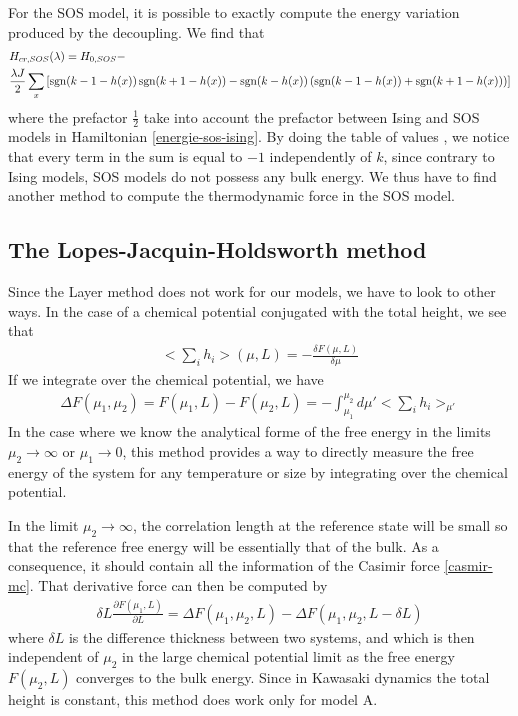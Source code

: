 For the SOS model, it is possible to exactly compute the energy variation produced by the decoupling. We find that
\begin{align}
&H_{cr,SOS}(\lambda) = H_{0,SOS} - \nonumber \\
&\frac{\lambda J}{2} \sum_x \left[ \operatorname{sgn}(k-1-h(x)) \operatorname{sgn}(k+1-h(x)) - \operatorname{sgn}(k-h(x)) \left( \operatorname{sgn}(k-1-h(x))+\operatorname{sgn}(k+1-h(x)) \right) \right]
\end{align}
where the prefactor $\frac{1}{2}$ take into account the prefactor between Ising and SOS models in Hamiltonian \eqref{energie-sos-ising}. By doing the table of values , we notice that every term in the sum is equal to $-1$ independently of $k$, since contrary to Ising models, SOS models do not possess any bulk energy. {\color{red}We thus have to find another method to compute the thermodynamic force in the SOS model.}

\subsection{The Lopes-Jacquin-Holdsworth method}
    \label{sec-lopes}
Since the Layer method does not work for our models, we have to look to other ways. In the case of a chemical potential conjugated with the total height, we see that \cite{lopes_cardozo_critical_2014}
\begin{align}
<\sum_i h_i>(\mu,L) = - \frac{\delta F(\mu,L)}{\delta \mu}
\end{align} 
If we integrate over the chemical potential, we have
\begin{align}
\Delta F(\mu_1,\mu_2) = F(\mu_1,L) - F(\mu_2,L) = - \int_{\mu_1}^{\mu_2} d\mu' <\sum_i h_i>_{\mu'}
\label{integration-cardozo}
\end{align}
In the case where we know the analytical forme of the free energy in the limits $\mu_2 \to \infty$ or $\mu_1 \to 0$, this method provides a way to directly measure the free energy of the system for any temperature or size by integrating over the chemical potential.

In the limit $\mu_2 \to \infty$, the correlation length at the reference state will be small so that the reference free energy will be essentially that of the bulk. As a consequence, it should contain all the information of the Casimir force \eqref{casmir-mc}. That derivative force can then be computed by 
\begin{align}
    \delta L \frac{\partial F(\mu_1,L)}{\partial L} = \Delta F(\mu_1,\mu_2,L)-\Delta F(\mu_1,\mu_2,L-\delta L)
    \label{cas-lopes}
\end{align}
where $\delta L$ is the difference thickness between two systems, and which is then independent of $\mu_2$ in the large chemical potential limit as the free energy $F(\mu_2,L)$ converges to the bulk energy.
Since in Kawasaki dynamics the total height is constant, this method does work only for model A.

